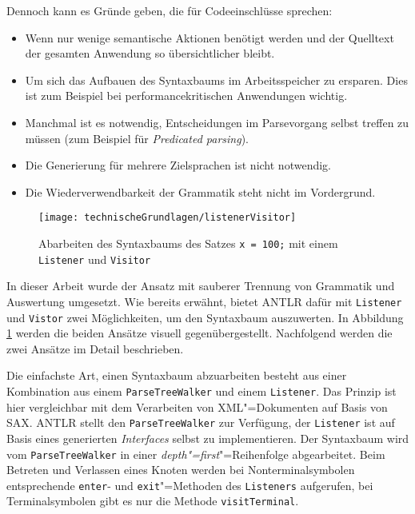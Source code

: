 Dennoch kann es Gründe geben, die für Codeeinschlüsse sprechen:
\begin{itemize}
    \item Wenn nur wenige semantische Aktionen benötigt werden und der Quelltext der gesamten Anwendung so übersichtlicher bleibt.
    \item Um sich das Aufbauen des Syntaxbaums im Arbeitsspeicher zu ersparen. Dies ist zum Beispiel bei performancekritischen Anwendungen wichtig.
    \item Manchmal ist es notwendig, Entscheidungen im Parsevorgang selbst treffen zu müssen (zum Beispiel für \emph{Predicated parsing}).
    \item Die Generierung für mehrere Zielsprachen ist nicht notwendig.
    \item Die Wiederverwendbarkeit der Grammatik steht nicht im Vordergrund.
\end{itemize}

\begin{figure}[b]
    \centering
    \texttt{[image: technischeGrundlagen/listenerVisitor]}
    \caption{Abarbeiten des Syntaxbaums des Satzes \lstinline{x = 100;} mit einem \lstinline{Listener} und \lstinline{Visitor} \cite{ANTLR4Reference}}
    \label{fig:listenerVisitor}
\end{figure}

In dieser Arbeit wurde der Ansatz mit sauberer Trennung von Grammatik und Auswertung umgesetzt. Wie bereits erwähnt, bietet ANTLR dafür mit \lstinline{Listener} und \lstinline{Vistor} zwei Möglichkeiten, um den Syntaxbaum auszuwerten. In Abbildung \ref{fig:listenerVisitor} werden die beiden Ansätze visuell gegenübergestellt. Nachfolgend werden die zwei Ansätze im Detail beschrieben.

Die einfachste Art, einen Syntaxbaum abzuarbeiten besteht aus einer Kombination aus einem \lstinline{ParseTreeWalker} und einem \lstinline{Listener}. Das Prinzip ist hier vergleichbar mit dem Verarbeiten von XML"=Dokumenten auf Basis von SAX. ANTLR stellt den \lstinline{ParseTreeWalker} zur Verfügung, der \lstinline{Listener} ist auf Basis eines generierten \emph{Interfaces} selbst zu implementieren. Der Syntaxbaum wird vom \lstinline{ParseTreeWalker} in einer \emph{depth"=first}"=Reihenfolge abgearbeitet. Beim Betreten und Verlassen eines Knoten werden bei Nonterminalsymbolen entsprechende \lstinline{enter}- und \lstinline{exit}"=Methoden des \lstinline{Listeners} aufgerufen, bei Terminalsymbolen gibt es nur die Methode \lstinline{visitTerminal}.

